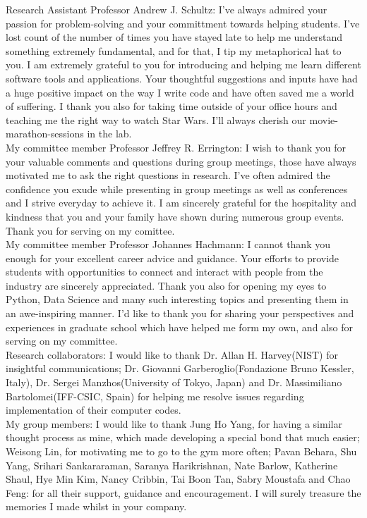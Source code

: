 \noindent Research Assistant Professor Andrew J. Schultz: I've always admired your passion for problem-solving and your committment towards helping students. I've lost count of the number of times you have stayed late to help me understand something extremely fundamental, and for that, I tip my metaphorical hat to you. I am extremely grateful to you for introducing and helping me learn different software tools and applications. Your thoughtful suggestions and inputs have had a huge positive impact on the way I write code and have often saved me a world of suffering. I thank you also for taking time outside of your office hours and teaching me the right way to watch Star Wars. I'll always cherish our movie-marathon-sessions in the lab.\\

\noindent My committee member Professor Jeffrey R. Errington: I wish to thank you for your valuable comments and questions during group meetings, those have always motivated me to ask the right questions in research. I've often admired the confidence you exude while presenting in group meetings as well as conferences and I strive everyday to achieve it. I am sincerely grateful for the hospitality and kindness that you and your family have shown during numerous group events.  Thank you for serving on my comittee.\\

\noindent My committee member Professor Johannes Hachmann: I cannot thank you enough for your excellent career advice and guidance. Your efforts to provide students with opportunities to connect and interact with people from the industry are sincerely appreciated. Thank you also for opening my eyes to Python, Data Science and many such interesting topics and presenting them in an awe-inspiring manner. I'd like to thank you for sharing your perspectives and experiences in graduate school which have helped me form my own, and also for serving on my committee.\\

\noindent Research collaborators: I would like to thank Dr. Allan H. Harvey(NIST) for insightful communications; Dr. Giovanni Garberoglio(Fondazione Bruno Kessler, Italy), Dr. Sergei Manzhos(University of Tokyo, Japan) and Dr. Massimiliano Bartolomei(IFF-CSIC, Spain) for helping me resolve issues regarding implementation of their computer codes.\\

\noindent My group members: I would like to thank Jung Ho Yang, for having a similar thought process as mine, which made developing a special bond that much easier; Weisong Lin, for motivating me to go to the gym more often; Pavan Behara, Shu Yang, Srihari Sankararaman, Saranya Harikrishnan, Nate Barlow, Katherine Shaul, Hye Min Kim, Nancy Cribbin, Tai Boon Tan, Sabry Moustafa and Chao Feng: for all their support, guidance and encouragement. I will surely treasure the memories I made whilst in your company.\\

